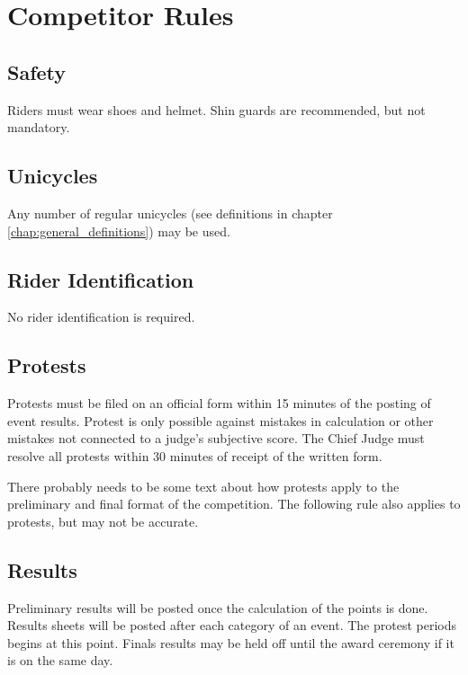 \chapter{Competitor Rules}

\section{Safety}

Riders must wear shoes and helmet.
Shin guards are recommended, but not mandatory.

\section{Unicycles}

Any number of regular unicycles (see definitions in chapter \ref{chap:general_definitions}) may be used.

\section{Rider Identification}

No rider identification is required.

\section{Protests}

Protests must be filed on an official form within 15 minutes of the posting of event results.
Protest is only possible against mistakes in calculation or other mistakes not connected to a judge's subjective score.
The Chief Judge must resolve all protests within 30 minutes of receipt of the written form.

\begin{comment2016}
There probably needs to be some text about how protests apply to the preliminary and final format of the competition.
The following rule also applies to protests, but may not be accurate.
\end{comment2016}

\section{Results}
Preliminary results will be posted once the calculation of the points is done.
Results sheets will be posted after each category of an event.
The protest periods begins at this point.
Finals results may be held off until the award ceremony if it is on the same day.

